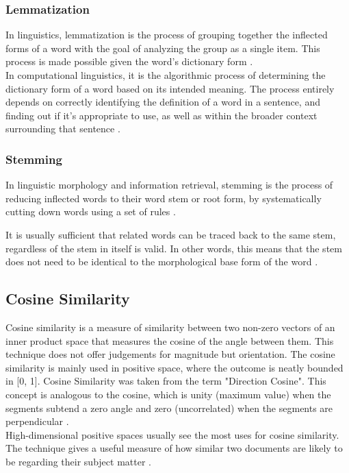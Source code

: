 \documentclass[10pt,11pt,12pt,oneside]{book}
\begin{document}
		\subsubsection{Lemmatization}
		In linguistics, lemmatization is the process of grouping together the inflected forms of a word with the goal of analyzing the group as a single item. This process is made possible given the word's dictionary form \cite{Mller2015}.\\
		
		In computational linguistics, it is the algorithmic process of determining the dictionary form of a word based on its intended meaning. The process entirely depends on correctly identifying the definition of a word in a sentence, and finding out if it's appropriate to use, as well as within the broader context surrounding that sentence \cite{Mller2015}.
		
		
		\subsubsection{Stemming}
		In linguistic morphology and information retrieval, stemming is the process of reducing inflected words to their word stem or root form, by systematically cutting down words using a set of rules \cite{lovins1968development}.
		 
		It is usually sufficient that related words can be traced back to the same stem, regardless of the stem in itself is valid. In other words, this means that the stem does not need to be identical to the morphological base form of the word \cite{lovins1968development}.
	
	\subsection{Cosine Similarity}
	Cosine similarity is a measure of similarity between two non-zero vectors of an inner product space that measures the cosine of the angle between them. This technique does not offer judgements for magnitude but orientation.  The cosine similarity is mainly used in positive space, where the outcome is neatly bounded in [0, 1]. Cosine Similarity was taken from the term "Direction Cosine". This concept is analogous to the cosine, which is unity (maximum value) when the segments subtend a zero angle and zero (uncorrelated) when the segments are perpendicular \cite{singhal2001modern}.\\
	
	High-dimensional positive spaces usually see the most uses for cosine similarity. The technique gives a useful measure of how similar two documents are likely to be regarding their subject matter \cite{singhal2001modern}.\\
	
\end{document}
